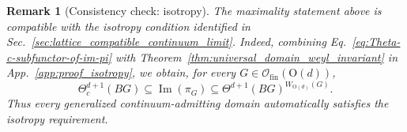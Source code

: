 \documentclass[aps,prx,reprint,superscriptaddress,twocolumn,amsmath,amssymb,amsfonts, nofootinbib]{revtex4-2}
\newcommand{\ofin}{\mathcal{O}_{\text{fin}}}
\theoremstyle{apsstyle}
\newtheorem{remark}[theorem]{Remark}
\begin{document}
\bigskip 

\begin{remark}[Consistency check: isotropy]
\label{rmk:univ_isotropy_consistency}
The maximality statement above is compatible with the isotropy condition identified in Sec.~\ref{sec:lattice_compatible_continuum_limit}. Indeed, combining Eq.~\eqref{eq:Theta-c-subfunctor-of-im-pi} with Theorem~\ref{thm:universal_domain_weyl_invariant} in App.~\ref{app:proof_isotropy}, we obtain, for every $G\in\ofin(\mathrm{O}(d))$,
\begin{equation*}
    \Theta^{d+1}_{c}(BG)
    \subseteq
    \operatorname{Im}(\pi_G)
    \subseteq
    \Theta^{d+1}(BG)^{W_{\mathrm{O}(d)}(G)}.
\end{equation*}
Thus every generalized continuum-admitting domain automatically satisfies the isotropy requirement.
\end{remark}

\bigskip 
\end{document}
